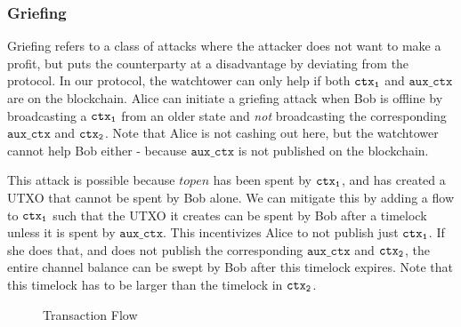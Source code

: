 \subsubsection{Griefing}
Griefing refers to a class of attacks where the attacker does not want to make a profit, but puts the counterparty at a disadvantage by deviating from the protocol. In our protocol, the watchtower can only help if both $\texttt{ctx\textsubscript{1}}$ and $\texttt{aux\_ctx}$ are on the blockchain. Alice can initiate a griefing attack when Bob is offline by broadcasting a $\texttt{ctx\textsubscript{1}}$ from an older state and \textit{not} broadcasting the corresponding $\texttt{aux\_ctx}$ and $\texttt{ctx\textsubscript{2}}$. Note that Alice is not cashing out here, but the watchtower cannot help Bob either - because $\texttt{aux\_ctx}$ is not published on the blockchain.

This attack is possible because $topen$ has been spent by $\texttt{ctx\textsubscript{1}}$, and has created a UTXO that cannot be spent by Bob alone. We can mitigate this by adding a flow to $\texttt{ctx\textsubscript{1}}$ such that the UTXO it creates can be spent by Bob after a timelock unless it is spent by $\texttt{aux\_ctx}$. This incentivizes Alice to not publish just $\texttt{ctx\textsubscript{1}}$. If she does that, and does not publish the corresponding $\texttt{aux\_ctx}$ and $\texttt{ctx\textsubscript{2}}$, the entire channel balance can be swept by Bob after this timelock expires. Note that this timelock has to be larger than the timelock in $\texttt{ctx\textsubscript{2}}$. 

\begin{figure}[H]
\begin{centering}
\caption{Transaction Flow}
\label{transaction_flow}
\end{centering} 
\end{figure}

